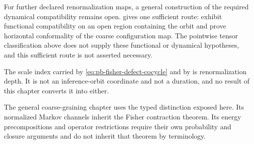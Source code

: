 For further declared renormalization maps, a general construction of the
required dynamical compatibility remains open.
 gives one sufficient route:
exhibit functional compatibility on an open region containing the orbit and
prove horizontal conformality of the coarse configuration map. The
pointwise tensor classification above does not supply these functional or
dynamical hypotheses, and this sufficient route is not asserted necessary.

The scale index carried by \eqref{eq:pb-fisher-defect-cocycle} and by
 is renormalization depth.  It is not an
inference-orbit coordinate and not a duration, and no result of this chapter
converts it into either.  

The general coarse-graining chapter uses the typed distinction exposed here.
Its normalized Markov channels inherit the Fisher contraction theorem.  Its energy
precompositions and operator restrictions require their own probability and
closure arguments and do not inherit that theorem by terminology.
